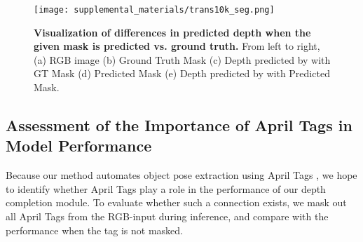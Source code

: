 \begin{table}[!t]
\centering
\caption{\textbf{Inference using predicted object masks.} We assess the performance of various models with Novel 1 Object images when the given mask input is predicted by the pre-trained model in \citep{TransLab}. The arrows beside the metrics denote whether lower or higher values are more desired. }
\label{t3}
\label{tab:trans10k_mask_results}
\end{table}

\begin{figure}[t]
\centering
\texttt{[image: supplemental\_materials/trans10k\_seg.png]}\\
\caption{\textbf{Visualization of differences in predicted depth when the given mask is predicted vs. ground truth.} From left to right, (a) RGB image (b) Ground Truth Mask (c) Depth predicted by \algoName with GT Mask (d) Predicted Mask (e) Depth predicted by \algoName with Predicted Mask.
}
\label{fig:trans10k_mask}
\end{figure}

\subsection{Assessment of the Importance of April Tags in Model Performance}
Because our method automates object pose extraction using April Tags \citep{apriltag2}, we hope to identify whether April Tags play a role in the performance of our depth completion module. To evaluate whether such a connection exists, we mask out all April Tags from the RGB-input during inference, and compare with the \algoName performance when the tag is not masked.

